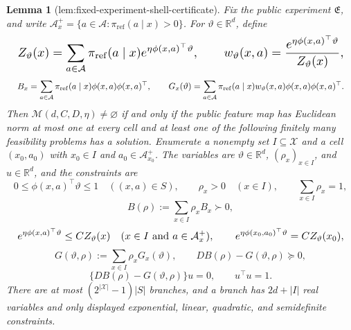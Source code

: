 \documentclass{article}
\newtheorem{lemma}{Lemma}
\begin{document}
\begin{lemma}[lem:fixed-experiment-shell-certificate]\label{lem:fixed-experiment-shell-certificate}
Fix the public experiment \(\mathfrak E\), and write \(\mathcal A_x^+=\{a\in\mathcal A:\pi_{\mathrm{ref}}(a\mid x)>0\}\). For \(\vartheta\in\mathbb R^d\), define
\[
\makebox[\linewidth][c]{\resizebox{0.98\linewidth}{!}{\(\displaystyle Z_\vartheta(x)=\sum_{a\in\mathcal A}\pi_{\mathrm{ref}}(a\mid x)e^{\eta\phi(x,a)^\top\vartheta},\qquad
w_\vartheta(x,a)=\frac{e^{\eta\phi(x,a)^\top\vartheta}}{Z_\vartheta(x)},\)}}
\]
\[
\makebox[\linewidth][c]{\resizebox{0.98\linewidth}{!}{\(\displaystyle B_x=\sum_{a\in\mathcal A}\pi_{\mathrm{ref}}(a\mid x)\phi(x,a)\phi(x,a)^\top,
\qquad
G_x(\vartheta)=\sum_{a\in\mathcal A}\pi_{\mathrm{ref}}(a\mid x)w_\vartheta(x,a)\phi(x,a)\phi(x,a)^\top.\)}}
\]
Then \(\mathcal M(d,C,D,\eta)\ne\varnothing\) if and only if the public feature map has Euclidean norm at most one at every cell and at least one of the following finitely many feasibility problems has a solution. Enumerate a nonempty set \(I\subseteq\mathcal X\) and a cell \((x_0,a_0)\) with \(x_0\in I\) and \(a_0\in\mathcal A_{x_0}^+\). The variables are \(\vartheta\in\mathbb R^d\), \((\rho_x)_{x\in I}\), and \(u\in\mathbb R^d\), and the constraints are
\[
0\le\phi(x,a)^\top\vartheta\le1\quad((x,a)\in S),\qquad
\rho_x>0\quad(x\in I),\qquad \sum_{x\in I}\rho_x=1,
\]
\[
B(\rho):=\sum_{x\in I}\rho_xB_x\succ0,
\]
\[
\makebox[\linewidth][c]{\resizebox{0.98\linewidth}{!}{\(\displaystyle e^{\eta\phi(x,a)^\top\vartheta}\le C Z_\vartheta(x)\quad(x\in I\text{ and }a\in\mathcal A_x^+),
\qquad
e^{\eta\phi(x_0,a_0)^\top\vartheta}=C Z_\vartheta(x_0),\)}}
\]
\[
G(\vartheta,\rho):=\sum_{x\in I}\rho_xG_x(\vartheta),\qquad
DB(\rho)-G(\vartheta,\rho)\succeq0,
\]
\[
\{DB(\rho)-G(\vartheta,\rho)\}u=0,\qquad u^\top u=1.
\]
There are at most \((2^{|\mathcal X|}-1)|S|\) branches, and a branch has \(2d+|I|\) real variables and only displayed exponential, linear, quadratic, and semidefinite constraints.
\end{lemma}
\end{document}

